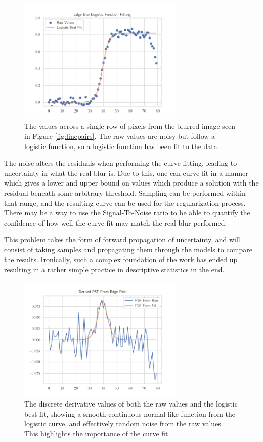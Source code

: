 \documentclass[letterpaper, 10pt, titlepage, twocolumn]{article}
\begin{document}
\begin{figure}[H]
  \centering
  \includegraphics[width=8cm]{edgefit.png}
  \caption{The values across a single row of pixels from the blurred image seen in Figure \ref{fig:linepairs}. The raw values are noisy but follow a logistic function, so a logistic function has been fit to the data.}
  \label{fig:esf}
\end{figure}

The noise alters the residuals when performing the curve fitting, leading to uncertainty in what the real blur is. Due to this, one can curve fit in a manner which gives a lower and upper bound on values which produce a solution with the residual beneath some arbitrary threshold. Sampling can be performed within that range, and the resulting curve can be used for the regularization process. There may be a way to use the Signal-To-Noise ratio to be able to quantify the confidence of how well the curve fit may match the real blur performed.

This problem takes the form of forward propagation of uncertainty, and will consist of taking samples and propagating them through the models to compare the results. Ironically, such a complex foundation of the work has ended up resulting in a rather simple practice in descriptive statistics in the end. 

\begin{figure}[H]
  \centering
  \includegraphics[width=8cm]{derivedpsf.png}
  \caption{The discrete derivative values of both the raw values and the logistic best fit, showing a smooth continuous normal-like function from the logistic curve, and effectively random noise from the raw values. This highlights the importance of the curve fit.}
  \label{fig:psf}
\end{figure}
\end{document}
